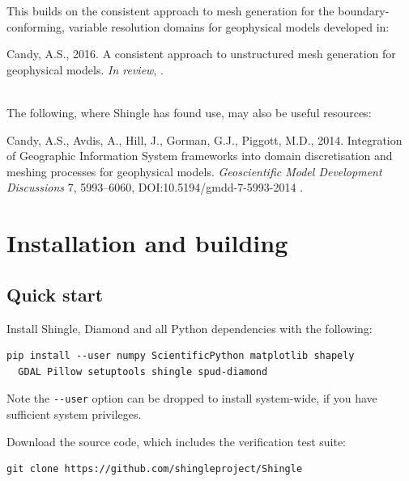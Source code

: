 \documentclass[a4paper, 10pt]{book}
\providecommand{\shingle}{Shingle\xspace}
\begin{document}
\medskip
\noindent
This builds on the consistent approach to mesh generation for the boundary-conforming, variable resolution domains for  geophysical models developed in:
\par\vskip 4pt\noindent\hspace{0.02\columnwidth}%
\begin{minipage}{0.9\columnwidth}%
Candy, A.S., 2016. A consistent approach to unstructured mesh generation for geophysical models. \emph{In review}, \citep{candybrep}.
\end{minipage}
\\

\medskip
\noindent
The following, where \shingle has found use, may also be useful resources:
\par\vskip 4pt\noindent\hspace{0.02\columnwidth}%
\begin{minipage}{0.9\columnwidth}%
Candy, A.S., Avdis, A., Hill, J., Gorman, G.J., Piggott, M.D., 2014.
Integration of Geographic Information System frameworks into domain discretisation and meshing processes for geophysical models.
\emph{Geoscientific Model Development Discussions} 7, 5993--6060, DOI:10.5194/gmdd-7-5993-2014 \citep{candygis}.
\end{minipage}




\chapter{Installation and building}
%
\section{Quick start}

\noindent
Install \shingle, Diamond and all Python dependencies with the following:
\begin{verbatim}
pip install --user numpy ScientificPython matplotlib shapely
  GDAL Pillow setuptools shingle spud-diamond
\end{verbatim}
Note the \verb+--user+ option can be dropped to install system-wide, if you have sufficient system privileges. 
\vspace{1ex}

\noindent
Download the source code, which includes the verification test suite:
\begin{verbatim}
git clone https://github.com/shingleproject/Shingle
\end{verbatim}
\end{document}
